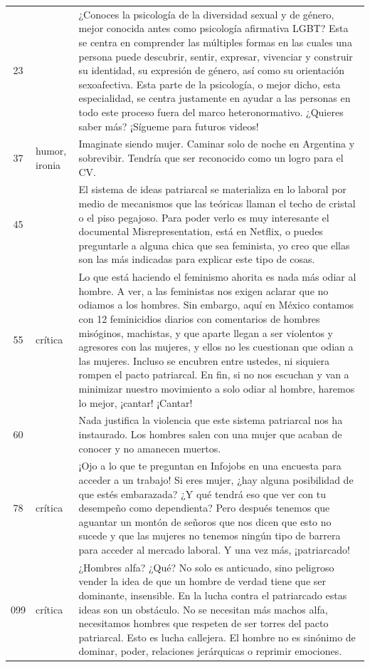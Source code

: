 \begin{longtable}{c>{\raggedright}p{2.0cm}p{12.1cm}}
\midrule
23 &  & ¿Conoces la psicología de la diversidad sexual y de género, mejor conocida antes como psicología afirmativa LGBT? Esta se centra en comprender las múltiples formas en las cuales una persona puede descubrir, sentir, expresar, vivenciar y construir su identidad, su expresión de género, así como su orientación sexoafectiva. Esta parte de la psicología, o mejor dicho, esta especialidad, se centra justamente en ayudar a las personas en todo este proceso fuera del marco heteronormativo. ¿Quieres saber más? ¡Sígueme para futuros videos! \\
37 & humor, ironia & Imaginate siendo mujer. Caminar solo de noche en Argentina y sobrevibir. Tendría que ser reconocido como un logro para el CV. \\
45 &  & El sistema de ideas patriarcal se materializa en lo laboral por medio de mecanismos que las teóricas llaman el techo de cristal o el piso pegajoso. Para poder verlo es muy interesante el documental Misrepresentation, está en Netflix, o puedes preguntarle a alguna chica que sea feminista, yo creo que ellas son las más indicadas para explicar este tipo de cosas. \\
55 & crítica & Lo que está haciendo el feminismo ahorita es nada más odiar al hombre. A ver, a las feministas nos exigen aclarar que no odiamos a los hombres. Sin embargo, aquí en México contamos con 12 feminicidios diarios con comentarios de hombres misóginos, machistas, y que aparte llegan a ser violentos y agresores con las mujeres, y ellos no les cuestionan que odian a las mujeres. Incluso se encubren entre ustedes, ni siquiera rompen el pacto patriarcal. En fin, si no nos escuchan y van a minimizar nuestro movimiento a solo odiar al hombre, haremos lo mejor, ¡cantar! ¡Cantar! \\
60 &  & Nada justifica la violencia que este sistema patriarcal nos ha instaurado. Los hombres salen con una mujer que acaban de conocer y no amanecen muertos. \\
78 & crítica & ¡Ojo a lo que te preguntan en Infojobs en una encuesta para acceder a un trabajo! Si eres mujer, ¿hay alguna posibilidad de que estés embarazada? ¿Y qué tendrá eso que ver con tu desempeño como dependienta? Pero después tenemos que aguantar un montón de señoros que nos dicen que esto no sucede y que las mujeres no tenemos ningún tipo de barrera para acceder al mercado laboral. Y una vez más, ¡patriarcado! \\
099 & crítica & ¿Hombres alfa? ¿Qué? No solo es anticuado, sino peligroso vender la idea de que un hombre de verdad tiene que ser dominante, insensible. En la lucha contra el patriarcado estas ideas son un obstáculo. No se necesitan más machos alfa, necesitamos hombres que respeten de ser torres del pacto patriarcal. Esto es lucha callejera. El hombre no es sinónimo de dominar, poder, relaciones jerárquicas o reprimir emociones. \\

\end{longtable}
